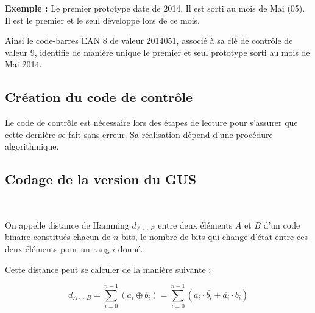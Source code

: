 \textbf{Exemple :}
Le premier prototype date de 2014.
Il est sorti au mois de Mai (05).
Il est le premier et le seul développé lors de ce mois.

\newpage

Ainsi le code-barres EAN 8 de valeur 2014051, associé à sa clé de contrôle de valeur 9, identifie de manière unique le premier et seul prototype sorti au mois de Mai 2014.

\subsection{Création du code de contrôle}

Le code de contrôle est nécessaire lors des étapes de lecture pour s'assurer que cette dernière se fait sans erreur. Sa réalisation dépend d'une procédure algorithmique.



\subsection{Codage de la version du GUS}



~\

On appelle distance de Hamming $d_{A \leftrightarrow B}$ entre deux éléments $A$ et $B$ d'un code binaire constitués chacun de $n$ bits, le nombre de bits qui change d'état entre ces deux éléments pour un rang $i$
donné.

Cette distance peut se calculer de la manière suivante :

$$d_{A \leftrightarrow B} = \sum_{i=0}^{n-1} (a_i \oplus b_i) = \sum_{i=0}^{n-1} (a_i \cdot \overline{b_i} + \overline{a_i} \cdot b_i)$$


